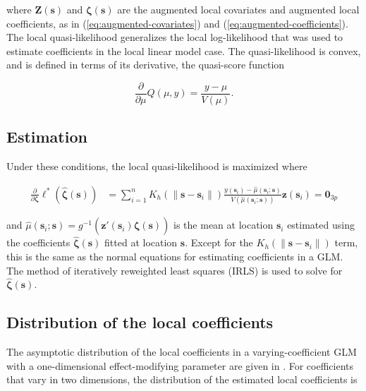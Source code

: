 \documentclass[english]{article}\usepackage[]{graphicx}\usepackage[]{color}
\theoremstyle{plain}
\theoremstyle{plain}
\begin{document}
where $\bm{Z}\left(\bm{s}\right)$ and $\bm{\zeta}\left(\bm{s}\right)$
are the augmented local covariates and augmented local coefficients,
as in (\ref{eq:augmented-covariates}) and (\ref{eq:augmented-coefficients}).
The local quasi-likelihood generalizes the local log-likelihood that
was used to estimate coefficients in the local linear model case.
The quasi-likelihood is convex, and is defined in terms of its derivative,
the quasi-score function

\[
\frac{\partial}{\partial\mu}Q\left(\mu,y\right)=\frac{y-\mu}{V\left(\mu\right)}.
\]



\subsection{Estimation}

Under these conditions, the local quasi-likelihood is maximized where

\begin{align}
\frac{\partial}{\partial\bm{\zeta}}\mathcal{\ell}^{*}\left(\hat{\bm{\zeta}}\left(\bm{s}\right)\right) & =\sum_{i=1}^{n}K_{h}\left(\|\bm{s}-\bm{s}_{i}\|\right)\frac{y\left(\bm{s}_{i}\right)-\hat{\mu}\left(\bm{s}_{i};\bm{s}\right)}{V\left(\hat{\mu}\left(\bm{s}_{i};\bm{s}\right)\right)}\bm{z}\left(\bm{s}_{i}\right)=\bm{0}_{3p}
\end{align}


and $\hat{\mu}\left(\bm{s}_{i};\bm{s}\right)=g^{-1}\left(\bm{z}'\left(\bm{s}_{i}\right)\hat{\bm{\zeta}}\left(\bm{s}\right)\right)$
is the mean at location $\bm{s}_{i}$ estimated using the coefficients
$\hat{\bm{\zeta}}\left(\bm{s}\right)$ fitted at location $\bm{s}$.
Except for the $K_{h}\left(\|\bm{s}-\bm{s}_{i}\|\right)$ term, this
is the same as the normal equations for estimating coefficients in
a GLM. The method of iteratively reweighted least squares (IRLS) is
used to solve for $\hat{\bm{\zeta}}\left(\bm{s}\right)$.


\subsection{Distribution of the local coefficients}

The asymptotic distribution of the local coefficients in a varying-coefficient
GLM with a one-dimensional effect-modifying parameter are given in
\citet{Cai-Fan-Li-2000}. For coefficients that vary in two dimensions,
the distribution of the estimated local coefficients is
\end{document}

